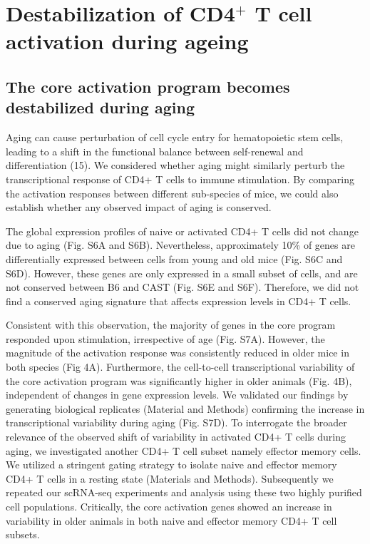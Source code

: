 \section{Destabilization of CD4$^+$ T cell activation during ageing}
\subsection*{The core activation program becomes destabilized during aging}

Aging can cause perturbation of cell cycle entry for hematopoietic stem cells, leading to a shift in the functional balance between self-renewal and differentiation (15). We considered whether aging might similarly perturb the transcriptional response of CD4+ T cells to immune stimulation. By comparing the activation responses between different sub-species of mice, we could also establish whether any observed impact of aging is conserved.

The global expression profiles of naive or activated CD4+ T cells did not change due to aging (Fig. S6A and S6B). Nevertheless, approximately 10\% of genes are differentially expressed between cells from young and old mice (Fig. S6C and S6D). However, these genes are only expressed in a small subset of cells, and are not conserved between B6 and CAST (Fig. S6E and S6F). Therefore, we did not find a conserved aging signature that affects expression levels in CD4+ T cells.

Consistent with this observation, the majority of genes in the core program responded upon stimulation, irrespective of age (Fig. S7A). However, the magnitude of the activation response was consistently reduced in older mice in both species (Fig 4A). Furthermore, the cell-to-cell transcriptional variability of the core activation program was significantly higher in older animals (Fig. 4B), independent of changes in gene expression levels. We validated our findings by generating biological replicates (Material and Methods) confirming the increase in transcriptional variability during aging (Fig. S7D).
To interrogate the broader relevance of the observed shift of variability in activated CD4+ T cells during aging, we investigated another CD4+ T cell subset namely effector memory cells. We utilized a stringent gating strategy to isolate naive and effector memory CD4+ T cells in a resting state (Materials and Methods). Subsequently we repeated our scRNA-seq experiments and analysis using these two highly purified cell populations. Critically, the core activation genes showed an increase in variability in older animals in both naive and effector memory CD4+ T cell subsets.

